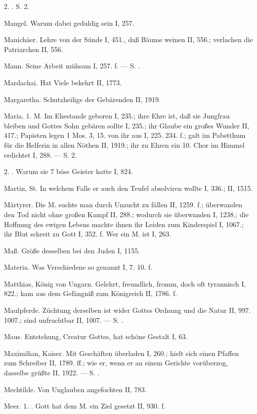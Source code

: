 2. . S.  2.

Mangel. Warum dabei geduldig sein I, 257.

Manichäer. Lehre von der Sünde I, 451., daß Bäume weinen II, 556.; verlachen die Patriarchen II, 556.

Mann. Seine Arbeit mühsam I, 257. f. — S. .

Mardachai. Hat Viele bekehrt II, 1773.

Margaretha. Schutzheilige der Gebärenden II, 1919.

Maria. 1.  M. Im Ehestande geboren I, 235.; ihre Ehre ist, daß sie Jungfrau bleiben und Gottes Sohn gebären sollte I, 235.; ihr Glaube ein großes Wunder II, 417.; Papisten legen 1 Mos. 3, 15. von ihr aus I, 225. 234. f.; galt im Pabstthum für die Helferin in allen Nöthen II, 1919.; ihr zu Ehren ein 10. Chor im Himmel erdichtet I, 288. — S.  2.

2. . Warum sie 7 böse Geister hatte I, 824.

Martin, St. In welchem Falle er auch den Teufel absolviren wollte I, 336.; II, 1515.

Märtyrer. Die  M. suchte man durch Unzucht zu fällen II, 1259. f.; überwanden den Tod nicht ohne großen Kampf II, 288.; wodurch sie überwanden I, 1238.; die Hoffnung des ewigen Lebens machte ihnen ihr Leiden zum Kinderspiel I, 1067.; ihr Blut schreit zu Gott I, 352. f. Wer ein M.  ist I, 263.

Maß. Größe desselben bei den Juden I, 1155.

Materia. Was Verschiedene so genannt I, 7. 10. f.

Matthias, König von Ungarn. Gelehrt, freundlich, fromm, doch oft tyrannisch I, 822.; kam aus dem Gefängniß zum Königreich II, 1786. f.

Maulpferde. Züchtung derselben ist wider Gottes Ordnung und die Natur II, 997. 1007.; sind unfruchtbar II, 1007. — S. .

Maus. Entstehung, Creatur Gottes, hat schöne Gestalt I, 63.

Maximilian, Kaiser. Mit Geschäften überladen I, 260.; hielt sich einen Pfaffen zum Schreiber II, 1789. ff.; wie er, wenn er an einem Gerichte vorüberzog, dasselbe grüßte II, 1922. — S. .

Mechtilde. Von Unglauben angefochten II, 783.

Meer. 1. . Gott hat dem M. ein Ziel gesetzt II, 930. f.

